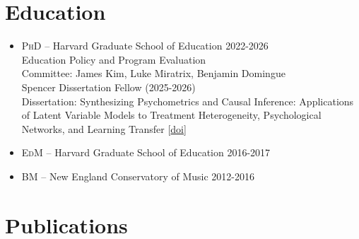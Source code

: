 \documentclass[11pt]{article}
\begin{document}
\section{Education}
\begin{itemize}
    \item \textsc{PhD --} Harvard Graduate School of Education \hfill 2022-2026 \\ 
 Education Policy and Program Evaluation \\ 
 Committee: James Kim, Luke Miratrix, Benjamin Domingue \\
Spencer Dissertation Fellow (2025-2026) \\
Dissertation: Synthesizing Psychometrics and Causal Inference: Applications of Latent Variable Models to Treatment Heterogeneity, Psychological Networks, and Learning Transfer [\href{https://search.proquest.com/dissertations-theses/synthesizing-psychometrics-causal-inference/docview/3351309392/se-2?accountid=11311}{doi}]
    \item \textsc{EdM --} Harvard Graduate School of Education \hfill 2016-2017
    \item \textsc{BM --} New England Conservatory of Music \hfill 2012-2016
\end{itemize}

\section{Publications}
\end{document}
